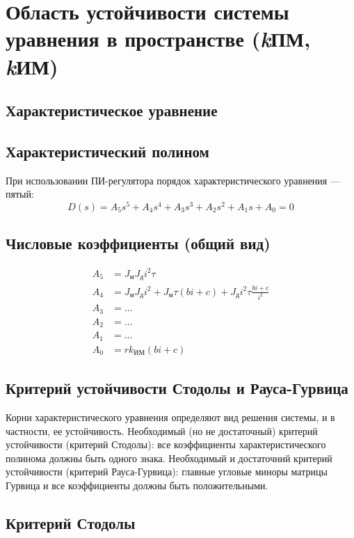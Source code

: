 \documentclass[14pt]{extreport}
\begin{document}
{        \newpage

        \section{Область устойчивости системы уравнения в пространстве (\textit{k}ПМ, \textit{k}ИМ)}
 \subsection{Характеристическое уравнение}

\subsection*{Характеристический полином}
При использовании ПИ-регулятора порядок характеристического уравнения — пятый:
\[
D(s) = A_5 s^5 + A_4 s^4 + A_3 s^3 + A_2 s^2 + A_1 s + A_0 = 0
\]

\subsection*{Числовые коэффициенты (общий вид)}
\[
\begin{aligned}
A_5 &= J_{\text{м}} J_{\text{д}} i^2 \tau \\
A_4 &= J_{\text{м}} J_{\text{д}} i^2 + J_{\text{м}} \tau (b i + c) + J_{\text{д}} i^2 \tau \frac{b i + c}{i^2} \\
A_3 &= \dots \\
A_2 &= \dots \\
A_1 &= \dots \\
A_0 &= r k_{\text{ИМ}} (b i + c)
\end{aligned}
\]

\subsection{Критерий устойчивости Стодолы и Рауса-Гурвица}

Корни характеристического уравнения определяют вид решения системы, и в частности, ее устойчивость. Необходимый (но не достаточный) критерий устойчивости (критерий Стодолы): все коэффициенты характеристического полинома должны быть одного знака. Необходимый и достаточний критерий устойчивости (критерий Рауса-Гурвица): главные угловые миноры матрицы Гурвица и все коэффициенты должны быть положительными.

\subsection*{Критерий Стодолы}

}
\end{document}
